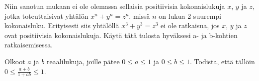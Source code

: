 \begin{kotitehtavasivu}
	\begin{tehtava}
		Niin sanotun  mukaan ei ole
		olemassa sellaisia positiivisia kokonaislukuja $x$, $y$
		ja $z$, jotka toteuttaisivat yhtälön $x^{n} + y^{n} = z^{n}$,
		missä $n$ on lukua 2 suurempi kokonaisluku.
		Erityisesti siis yhtälöllä $x^{3} + y^{3} = z^{3}$ ei
		ole ratkaisua, jos $x$, $y$ ja $z$ ovat positiivisia
		kokonaislukuja. Käytä tätä tulosta hyväksesi a- ja b-kohtien ratkaisemisessa.
            \begin{alakohdat}
		\end{alakohdat}
		\begin{vastaus}
		\end{vastaus}
	\end{tehtava}

	\begin{tehtava}
		Olkoot $a$ ja $b$ reaalilukuja, joille pätee $0 \le a \le 1$ ja $0 \le b \le 1$.
		Todista, että tällöin $0 \le \frac{a + b}{1 + ab} \le 1$.
		\begin{vastaus}
		\end{vastaus}
	\end{tehtava}

\end{kotitehtavasivu}
